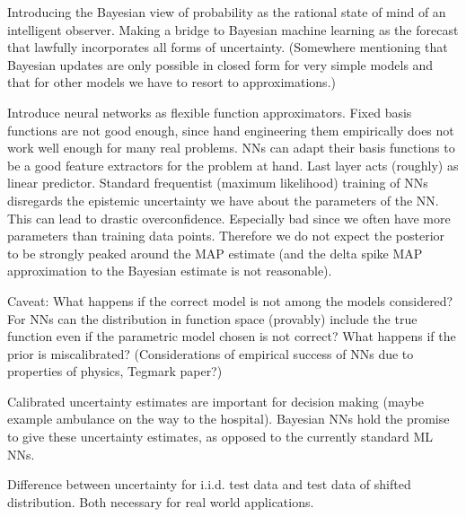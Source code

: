 \documentclass[../thesis.tex]{subfiles}
\begin{document}
Introducing the Bayesian view of probability as the rational state of mind of an intelligent observer. Making a bridge to Bayesian machine learning as the forecast that lawfully incorporates all forms of uncertainty. (Somewhere mentioning that Bayesian updates are only possible in closed form for very simple models and that for other models we have to resort to approximations.)

Introduce neural networks as flexible function approximators. Fixed basis functions are not good enough, since hand engineering them empirically does not work well enough for many real problems. NNs can adapt their basis functions to be a good feature extractors for the problem at hand. Last layer acts (roughly) as linear predictor. Standard frequentist (maximum likelihood) training of NNs disregards the epistemic uncertainty we have about the parameters of the NN. This can lead to drastic overconfidence. Especially bad since we often have more parameters than training data points. Therefore we do not expect the posterior to be strongly peaked around the MAP estimate (and the delta spike MAP approximation to the Bayesian estimate is not reasonable).

Caveat: What happens if the correct model is not among the models considered? For NNs can the distribution in function space (provably) include the true function even if the parametric model chosen is not correct? What happens if the prior is miscalibrated? (Considerations of empirical success of NNs due to properties of physics, Tegmark paper?)

Calibrated uncertainty estimates are important for decision making (maybe example ambulance on the way to the hospital). Bayesian NNs hold the promise to give these uncertainty estimates, as opposed to the currently standard ML NNs.

Difference between uncertainty for i.i.d. test data and test data of shifted distribution. Both necessary for real world applications.
\end{document}
